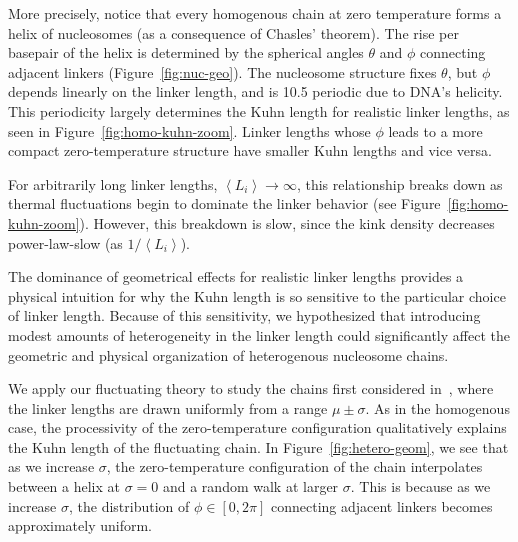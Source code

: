 \documentclass[%
 reprint,
superscriptaddress,
showpacs,preprintnumbers,
 amsmath,amssymb,
 aps,
 prl,
]{revtex4-1}
\newcommand{\meanli}{\left\langle{}L_i\right\rangle}
\begin{document}
More precisely, notice that every homogenous chain at zero temperature forms a
    helix of nucleosomes (as a consequence of Chasles' theorem).
The rise per basepair of the helix is determined by the spherical angles
    $\theta$ and $\phi$ connecting adjacent linkers (Figure~\ref{fig:nuc-geo}).
The nucleosome structure fixes $\theta$, but $\phi$ depends linearly on the
    linker length, and is \SI{10.5}{\basepair} periodic due to DNA's helicity.
This periodicity largely determines the Kuhn length for realistic linker
    lengths, as seen in Figure~\ref{fig:homo-kuhn-zoom}.
Linker lengths whose $\phi$ leads to a more compact zero-temperature structure
    have smaller Kuhn lengths and vice versa.

For arbitrarily long linker lengths, $\meanli\to\infty$, this relationship breaks
    down as thermal fluctuations begin to dominate the linker behavior (see
    Figure~\ref{fig:homo-kuhn-zoom}).
However, this breakdown is slow, since the kink density decreases power-law-slow
    (as $1/\meanli$).

The dominance of geometrical effects for realistic linker lengths provides a
    physical intuition for why the Kuhn length is so sensitive to the particular
    choice of linker length.
Because of this sensitivity, we hypothesized that introducing modest amounts of
    heterogeneity in the linker length could significantly affect the geometric
    and physical organization of heterogenous nucleosome chains.

We apply our fluctuating theory to study the chains first considered
    in~\cite{woodcock1993}, where the linker lengths are drawn uniformly from a
    range $\mu \pm \sigma$.
As in the homogenous case, the processivity of the zero-temperature
    configuration qualitatively explains the Kuhn length of the fluctuating chain.
In Figure~\ref{fig:hetero-geom}, we see that as we increase $\sigma$, the
    zero-temperature configuration of the chain interpolates between a helix at
    $\sigma = 0$ and a random walk at larger $\sigma$.
This is because as we increase $\sigma$, the distribution of $\phi \in [0, 2\pi]$ connecting
    adjacent linkers becomes approximately uniform.
\end{document}
